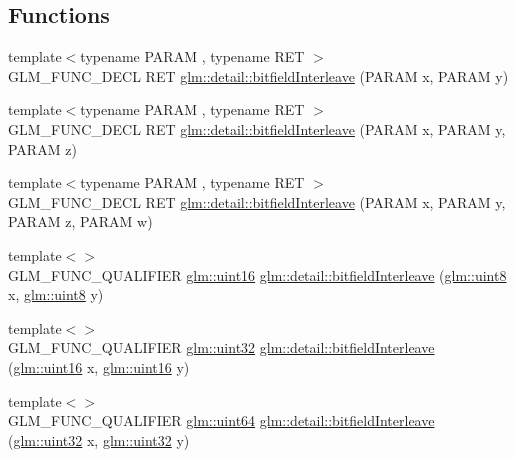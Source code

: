 \subsection*{Functions}
\begin{DoxyCompactItemize}
\item 
{\footnotesize template$<$typename P\+A\+R\+A\+M , typename R\+E\+T $>$ }\\G\+L\+M\+\_\+\+F\+U\+N\+C\+\_\+\+D\+E\+C\+L R\+E\+T \hyperlink{namespaceglm_1_1detail_a39644ee418ae41e3393d1cb6191e32a7}{glm\+::detail\+::bitfield\+Interleave} (P\+A\+R\+A\+M x, P\+A\+R\+A\+M y)
\item 
{\footnotesize template$<$typename P\+A\+R\+A\+M , typename R\+E\+T $>$ }\\G\+L\+M\+\_\+\+F\+U\+N\+C\+\_\+\+D\+E\+C\+L R\+E\+T \hyperlink{namespaceglm_1_1detail_aa2fdd8f720417a13990873ba704a3426}{glm\+::detail\+::bitfield\+Interleave} (P\+A\+R\+A\+M x, P\+A\+R\+A\+M y, P\+A\+R\+A\+M z)
\item 
{\footnotesize template$<$typename P\+A\+R\+A\+M , typename R\+E\+T $>$ }\\G\+L\+M\+\_\+\+F\+U\+N\+C\+\_\+\+D\+E\+C\+L R\+E\+T \hyperlink{namespaceglm_1_1detail_a606f6dc8c8314159fafef68f820c2c65}{glm\+::detail\+::bitfield\+Interleave} (P\+A\+R\+A\+M x, P\+A\+R\+A\+M y, P\+A\+R\+A\+M z, P\+A\+R\+A\+M w)
\item 
{\footnotesize template$<$$>$ }\\G\+L\+M\+\_\+\+F\+U\+N\+C\+\_\+\+Q\+U\+A\+L\+I\+F\+I\+E\+R \hyperlink{group__gtc__type__precision_gad8c2939e1fdd8e5828b31d95c52255d5}{glm\+::uint16} \hyperlink{namespaceglm_1_1detail_ac59c574dc7900d87786f5a96f82ea6e7}{glm\+::detail\+::bitfield\+Interleave} (\hyperlink{group__gtc__type__precision_ga1a7dcd8aac97cc8020817c94049deff2}{glm\+::uint8} x, \hyperlink{group__gtc__type__precision_ga1a7dcd8aac97cc8020817c94049deff2}{glm\+::uint8} y)
\item 
{\footnotesize template$<$$>$ }\\G\+L\+M\+\_\+\+F\+U\+N\+C\+\_\+\+Q\+U\+A\+L\+I\+F\+I\+E\+R \hyperlink{group__gtc__type__precision_ga202b6a53c105fcb7e531f9b443518451}{glm\+::uint32} \hyperlink{namespaceglm_1_1detail_ac5f2b38221d4447775e88f1b003f8113}{glm\+::detail\+::bitfield\+Interleave} (\hyperlink{group__gtc__type__precision_gad8c2939e1fdd8e5828b31d95c52255d5}{glm\+::uint16} x, \hyperlink{group__gtc__type__precision_gad8c2939e1fdd8e5828b31d95c52255d5}{glm\+::uint16} y)
\item 
{\footnotesize template$<$$>$ }\\G\+L\+M\+\_\+\+F\+U\+N\+C\+\_\+\+Q\+U\+A\+L\+I\+F\+I\+E\+R \hyperlink{group__gtc__type__precision_gae3632bf9b37da66233d78930dd06378a}{glm\+::uint64} \hyperlink{namespaceglm_1_1detail_a7f40bc91b3d293fae0f7df8de85cdcc6}{glm\+::detail\+::bitfield\+Interleave} (\hyperlink{group__gtc__type__precision_ga202b6a53c105fcb7e531f9b443518451}{glm\+::uint32} x, \hyperlink{group__gtc__type__precision_ga202b6a53c105fcb7e531f9b443518451}{glm\+::uint32} y)

\end{DoxyCompactItemize}
